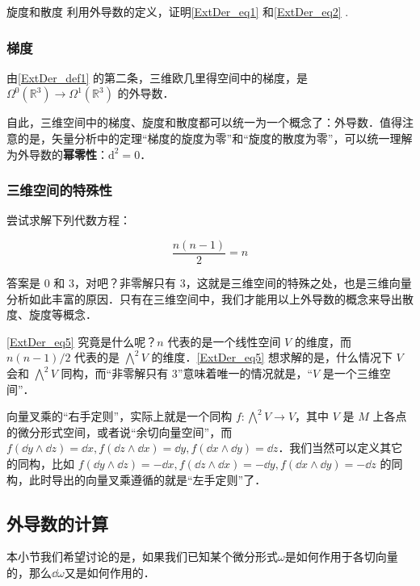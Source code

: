 \begin{exercise}{旋度和散度}
利用外导数的定义，证明\autoref{ExtDer_eq1} 和\autoref{ExtDer_eq2} .
\end{exercise}

\subsubsection{梯度}

由\autoref{ExtDer_def1} 的第二条，三维欧几里得空间中的梯度，是 $\Omega^0(\mathbb{R}^3)\rightarrow\Omega^1(\mathbb{R}^3)$ 的外导数．

自此，三维空间中的梯度、旋度和散度都可以统一为一个概念了：外导数．值得注意的是，矢量分析中的定理“梯度的旋度为零”和“旋度的散度为零”，可以统一理解为外导数的\textbf{幂零性}：$\mathrm{d}^2=0$．

\subsubsection{三维空间的特殊性}

尝试求解下列代数方程：

\begin{equation}\label{ExtDer_eq5}
\frac{n(n-1)}{2}=n
\end{equation}

答案是 $0$ 和 $3$，对吧？非零解只有 $3$，这就是三维空间的特殊之处，也是三维向量分析如此丰富的原因．只有在三维空间中，我们才能用以上外导数的概念来导出散度、旋度等概念．

\autoref{ExtDer_eq5} 究竟是什么呢？$n$ 代表的是一个线性空间 $V$ 的维度，而 $n(n-1)/2$ 代表的是 $\bigwedge^2 V$ 的维度．\autoref{ExtDer_eq5} 想求解的是，什么情况下 $V$ 会和 $\bigwedge^2 V$ 同构，而“非零解只有 $3$”意味着唯一的情况就是，“$V$ 是一个三维空间”．

向量叉乘的“右手定则”，实际上就是一个同构 $f:\bigwedge^2 V\to V$，其中 $V$ 是 $M$ 上各点的微分形式空间，或者说“余切向量空间”，而 $f(\dd y\wedge \dd z)=\dd x, f(\dd z\wedge \dd x)=\dd y, f(\dd x\wedge \dd y)=\dd z$．我们当然可以定义其它的同构，比如 $f(\dd y\wedge \dd z)=-\dd x, f(\dd z\wedge \dd x)=-\dd y, f(\dd x\wedge \dd y)=-\dd z$ 的同构，此时导出的向量叉乘遵循的就是“左手定则”了．



\subsection{外导数的计算}

本小节我们希望讨论的是，如果我们已知某个微分形式$\omega$是如何作用于各切向量的，那么$\dd\omega$又是如何作用的．


